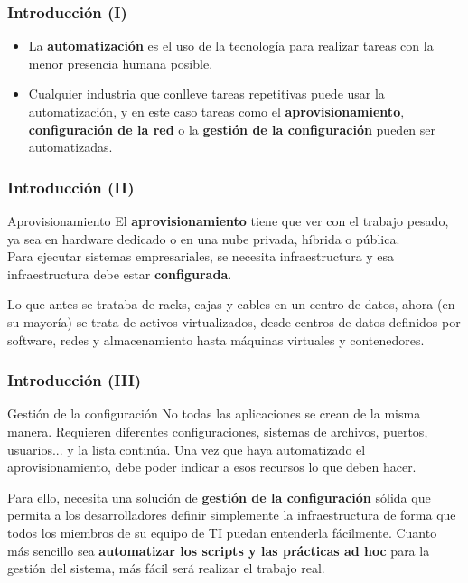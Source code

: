 \documentclass[
	11pt, %
]{beamer}
\begin{document}

\begin{frame}
	\frametitle{Introducción (I)}

	\begin{itemize}
		\item La \textbf{automatización} es el uso de la tecnología para realizar tareas con la menor presencia humana posible.
		\item Cualquier industria que conlleve tareas repetitivas puede usar la automatización, y en este caso tareas como el \textbf{aprovisionamiento}, \textbf{configuración de la red} o la \textbf{gestión de la configuración} pueden ser automatizadas. \cite{p1}

	\end{itemize}

\end{frame}


\begin{frame}
	\frametitle{Introducción (II)}

	\begin{block}{Aprovisionamiento}
		El \textbf{aprovisionamiento} tiene que ver con el trabajo pesado, ya sea en hardware dedicado o en una nube privada, híbrida o pública.\\
		Para ejecutar sistemas empresariales, se necesita infraestructura y esa infraestructura debe estar \textbf{configurada}.
	\end{block}
	\begin{block}{}
		Lo que antes se trataba de racks, cajas y cables en un centro de datos, ahora (en su mayoría) se trata de activos virtualizados, desde centros de datos definidos por software, redes y almacenamiento hasta máquinas virtuales y contenedores. \cite{p1}
	\end{block}

\end{frame}


\begin{frame}
	\frametitle{Introducción (III)}

	\begin{block}{Gestión de la configuración}
		No todas las aplicaciones se crean de la misma manera. Requieren diferentes configuraciones, sistemas de archivos, puertos, usuarios... y la lista continúa. Una vez que haya automatizado el aprovisionamiento, debe poder indicar a esos recursos lo que deben hacer.
	\end{block}
	\begin{block}{}
		Para ello, necesita una solución de \textbf{gestión de la configuración} sólida que permita a los desarrolladores definir simplemente la infraestructura de forma que todos los miembros de su equipo de TI puedan entenderla fácilmente. Cuanto más sencillo sea \textbf{automatizar los scripts y las prácticas ad hoc} para la gestión del sistema, más fácil será realizar el trabajo real. \cite{p1}
	\end{block}

\end{frame}
\end{document}
